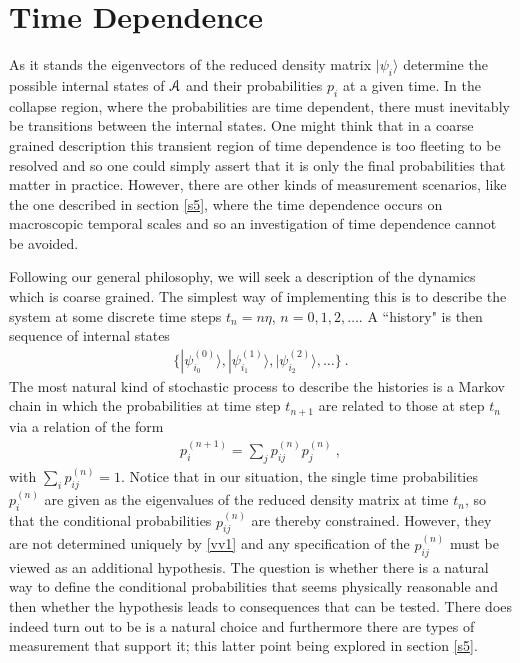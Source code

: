 \documentclass[12pt]{article}
\def\BA{{\EuScript A}}
\def\ket#1{| #1\rangle}
\newcommand{\EQ}[1]{\begin{equation}\begin{split} #1
\end{split}\end{equation}}
\begin{document}
\section{Time Dependence}\label{s4}

As it stands the eigenvectors of the reduced density matrix $\ket{\psi_i}$ determine the possible internal states of $\BA$ and their probabilities $p_i$ at a given time. 
In the collapse region, where the probabilities are time dependent, there must inevitably be transitions between the internal states. One might think that in a coarse grained description
this transient region of time dependence is too fleeting to be resolved and so one could simply assert that it is only the final probabilities that matter in practice. However, there are other kinds of measurement scenarios, like the one described in section \ref{s5}, where the time dependence occurs on macroscopic temporal scales and so an investigation of time dependence cannot be avoided.

Following our general philosophy, we will seek 
a description of the dynamics which is coarse grained. The simplest way of implementing this
is to describe the system at some discrete time
steps $t_n=n\eta$, $n=0,1,2,\ldots$. A ``history" is then sequence of internal states 
\EQ{
\Big\{\ket{\psi^{(0)}_{i_0}},\ket{\psi^{(1)}_{i_1}},\ket{\psi^{(2)}_{i_2}},\ldots\Big\}\ .
\label{plk}
}
The most natural kind of stochastic process to describe the histories is a Markov chain in which the probabilities at time step $t_{n+1}$ are related to those at step $t_n$ via a relation of the form
\EQ{
p_i^{(n+1)}=\sum_jp_{ij}^{(n)}p_j^{(n)}\ ,
\label{vv1}
}
with $\sum_ip_{ij}^{(n)}=1$. Notice that in our situation, the single time probabilities $p_i^{(n)}$ are given as the eigenvalues of the reduced density matrix at time $t_n$, 
so that the conditional probabilities $p_{ij}^{(n)}$ are thereby constrained. However, they are not determined uniquely by \eqref{vv1} and any specification of the $p_{ij}^{(n)}$ must be viewed as an additional hypothesis. The question is whether there is a natural way to define the conditional probabilities that seems physically reasonable and then whether the hypothesis leads to consequences that can be tested. There does indeed turn out to be is a natural choice and furthermore there are types of measurement that support it; this latter point being explored in section \ref{s5}. 
\end{document}
